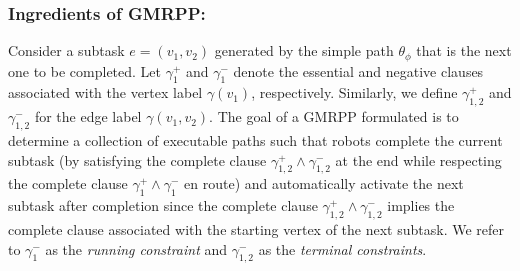 \documentclass[Afour,sageh,times]{sagej}
\begin{document}
{{ \subsubsection{Ingredients of GMRPP:}\label{sec:gmmpp1} Consider a subtask $e = (v_1, v_2)$ generated by the simple path $\theta_{\phi}$ that is the next one to be completed. Let $\gamma_1^+$ and $\gamma_1^-$ denote the essential and negative clauses associated with the vertex label $\gamma(v_1)$, respectively. Similarly, we define $\gamma_{1,2}^{+}$ and $\gamma_{1,2}^{-}$  for the edge label $\gamma(v_1, v_2)$. The goal of a GMRPP formulated  is to determine a collection of executable paths such that robots complete the current subtask (by satisfying the complete clause  $\gamma_{1,2}^+ \wedge \gamma_{1,2}^-$ at the end while respecting the complete clause $\gamma_1^+ \wedge \gamma_1^-$ en route) and automatically activate the next subtask after completion since the complete clause $\gamma_{1,2}^+ \wedge \gamma_{1,2}^-$ implies the complete clause associated with the starting vertex of the next subtask. We refer to $\gamma_1^-$ as the {\it running constraint} and $\gamma_{1,2}^- $  as the {\it terminal constraints}.

}}
\end{document}
